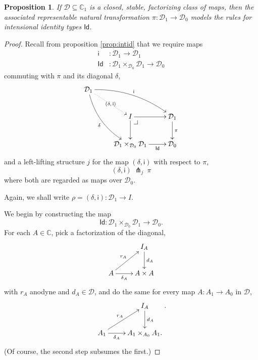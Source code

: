 \documentclass[12pt]{article}
\makeatletter
\newcommand{\C}{\ensuremath{\mathbb{C}}}
\newcommand{\D}{\ensuremath{\mathcal{D}}}
\newcommand{\pbcorner}[1][dr]{\save*!/#1-1.2pc/#1:(-1,1)@^{|-}\restore}
\newcommand{\Id}{\mathsf{Id}}
\newcommand{\iy}{\mathsf{i}}
\newtheorem{proposition}[theorem]{Proposition}
\theoremstyle{definition}
\makeatother
\begin{document}
\begin{proposition}\label{prop:id}
If $\D \subseteq \C_1$ is a closed,  stable, factorizing class of maps, then the associated representable natural transformation $\pi:\D_1\to\D_0$ models the rules for intensional identity types $\Id$.
\end{proposition}
\begin{proof}
Recall from proposition \ref{prop:intid} that we require maps  
\begin{align}
\iy &: \D_1 \to \D_1\\
\Id &: \D_1\times_{\D_0} \D_1 \to \D_0
\end{align}
commuting with $\pi$ and its diagonal $\delta$, 
%
\begin{equation*}%
\xymatrix{
\D_1 \ar@/{}_{1pc}/[ddr]_{\delta} \ar@{.>}[dr]|-{(\delta,\,\iy)} \ar@/{}^{1pc}/[drr]^{\iy} &&\\
& I \ar[r]  \ar[d]  \pbcorner & \D_1 \ar[d]^{\pi} \\
& \D_1\times_{\D_0} \D_1 \ar[r]_-{\Id} & \D_0
}
\end{equation*}
%
and a left-lifting structure $j$ for the map $(\delta,\iy)$ with respect to $\pi$,
$$(\delta,\iy)\ \pitchfork_j\ \pi$$
where both are regarded as maps over $\D_0$.

%
Again, we shall write $\rho = (\delta,\iy) : \D_1 \to I$.

We begin by constructing the map 
\[
\Id : \D_1\times_{\D_0} \D_1 \to  \D_0.
\]
%
For each $A\in\C$, pick a factorization of the diagonal,
\[
\xymatrix{
& I_A \ar[d]^{d_A}\\
A \ar[ru]^{r_A} \ar[r]_-{\delta_A} & A\times A}
\]
with $r_A$ anodyne and $d_A\in\D$, and do the same for every map $A: A_1 \to A_0$ in \D,
\[
\xymatrix{
& I_A \ar[d]^{d_A}\\
A_1 \ar[ru]^{r_A} \ar[r]_-{\delta_A} & A_1\times_{A_0} A_1.}.
\]
(Of course, the second step subsumes the first.)


\end{proof}
\end{document}

